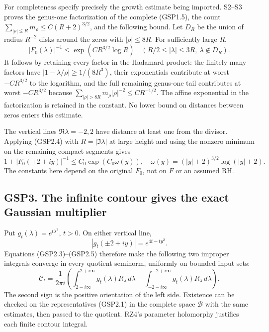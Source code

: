 For completeness specify precisely the growth estimate being imported.
S2--S3 proves the genus-one factorization of the complete (GSP1.5), the
count \(\sum_{|\rho|\le R}m_\rho\le C(R+2)^{3/2}\), and the following
bound. Let \(D_R\) be the union of radius \(R^{-2}\) disks around the
zeros with \(|\rho|\le8R\). For sufficiently large \(R\), \[
|F_0(\lambda)|^{-1}\le
\exp(CR^{3/2}\log R)
\quad(R/2\le|\lambda|\le3R,\ \lambda\notin D_R).
\tag{GSP2.4}
\] It follows by retaining every factor in the Hadamard product: the
finitely many factors have \(|1-\lambda/\rho|\ge1/(8R^3)\), their
exponentials contribute at worst \(-CR^{3/2}\) to the logarithm, and the
full remaining genus-one tail contributes at worst \(-CR^{3/2}\) because
\(\sum_{|\rho|>8R}m_\rho|\rho|^{-2}\le CR^{-1/2}\). The affine
exponential in the factorization is retained in the constant. No lower
bound on distances between zeros enters this estimate.

The vertical lines \(\Re\lambda=-2,2\) have distance at least one from
the divisor. Applying (GSP2.4) with \(R=|\Im\lambda|\) at large height
and using the nonzero minimum on the remaining compact segments gives \[
1+|F_0(\pm2+iy)|^{-1}\le C_0\exp(C_0\omega(y)),
\quad \omega(y)=(|y|+2)^{3/2}\log(|y|+2).
\tag{GSP2.5}
\] The constants here depend on the original \(F_0\), not on \(F\) or an
assumed RH.

\subsection{GSP3. The infinite contour gives the exact Gaussian
multiplier}\label{gsp3.-the-infinite-contour-gives-the-exact-gaussian-multiplier}

Put \(g_t(\lambda)=e^{t\lambda^2}\), \(t>0\). On either vertical line,
\[
|g_t(\pm2+iy)|=e^{4t-ty^2}.
\tag{GSP3.1}
\] Equations (GSP2.3)--(GSP2.5) therefore make the following two
improper integrals converge in every quotient seminorm, uniformly on
bounded input sets: \[
\mathcal C_t=
\frac1{2\pi i}\left(
\int_{2-i\infty}^{2+i\infty}g_t(\lambda)R_\lambda\,d\lambda
-\int_{-2-i\infty}^{-2+i\infty}g_t(\lambda)R_\lambda\,d\lambda
\right).
\tag{GSP3.2}
\] The second sign is the positive orientation of the left side.
Existence can be checked on the representatives (GSP2.1) in the complete
space \(\mathcal B\) with the same estimates, then passed to the
quotient. RZ4's parameter holomorphy justifies each finite contour
integral.

